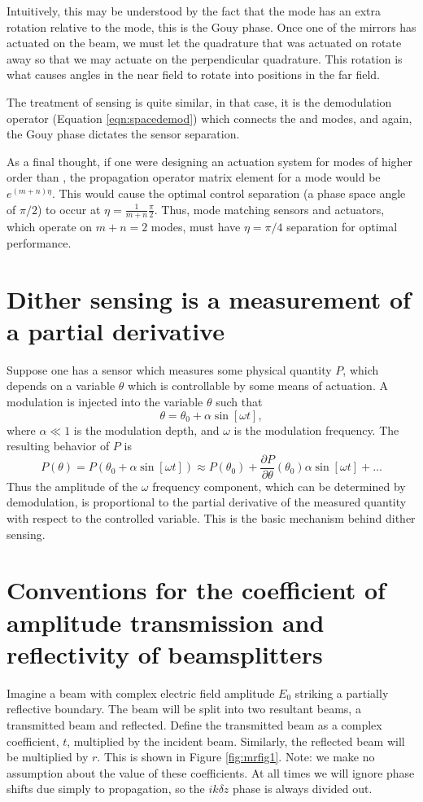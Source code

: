 Intuitively, this may be understood by the fact that the  mode has an extra rotation relative to the  mode, this is the Gouy phase. %
Once one of the mirrors has actuated on the beam, we must let the quadrature that was actuated on rotate away so that we may actuate on the perpendicular quadrature. %
This rotation is what causes angles in the near field to rotate into positions in the far field. %


The treatment of sensing is quite similar, in that case, it is the demodulation operator (Equation \ref{eqn:spacedemod}) which connects the  and  modes, and again, the Gouy phase dictates the sensor separation.

As a final thought, if one were designing an actuation system for modes of higher order than , the propagation operator matrix element for a  mode would be $e^{(m+n)\eta}$. %
This would cause the optimal control separation (a phase space angle of $\pi/2$) to occur at $\eta=\frac{1}{m+n}\frac{\pi}{2}$. %
Thus, mode matching sensors and actuators, which operate on $m+n=2$ modes, must have  $\eta=\pi/4$ separation for optimal performance.

\section{Dither sensing is a measurement of a partial derivative}
\label{sec:dithersens}
Suppose one has a sensor which measures some physical quantity $P$, which depends on a variable $\theta$ which is controllable by some means of actuation. %
A modulation is injected into the variable $\theta$ such that
\begin{equation}
\theta = \theta_0+\alpha \sin[\omega t],
\end{equation}
where $\alpha \ll 1$ is the modulation depth, and $\omega$ is the modulation frequency. %
The resulting behavior of $P$ is
\begin{equation}
P(\theta)=P(\theta_0+\alpha \sin[\omega t])\approx P(\theta_0)+\frac{\partial P}{\partial \theta}(\theta_0)\alpha \sin[\omega t] + \ldots
\end{equation}
Thus the amplitude of the $\omega$ frequency component, which can be determined by demodulation, is proportional to the partial derivative of the measured quantity with respect to the controlled variable. %
This is the basic mechanism behind dither sensing.
\section{Conventions for the coefficient of amplitude transmission and reflectivity of beamsplitters}
Imagine a beam with complex electric field amplitude $E_0$ striking a partially reflective boundary. %
The beam will be split into two resultant beams, a transmitted beam and reflected. %
Define the transmitted beam as a complex coefficient, $t$, multiplied by the incident beam. %
Similarly, the reflected beam will be multiplied by $r$. %
This is shown in Figure \ref{fig:mrfig1}. %
Note: we make no assumption about the value of these coefficients. %
At all times we will ignore phase shifts due simply to propagation, so the $ik\delta z$ phase is always divided out.


